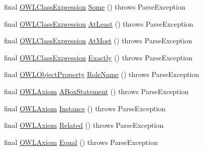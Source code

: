 \begin{DoxyCompactItemize}
\item 
final \hyperlink{interfaceorg_1_1semanticweb_1_1owlapi_1_1model_1_1_o_w_l_class_expression}{O\-W\-L\-Class\-Expression} \hyperlink{classorg_1_1coode_1_1owl_1_1krssparser_1_1_k_r_s_s_parser_ae93e7a9edf4acd496ed58d42231da0d2}{Some} ()  throws Parse\-Exception 
\item 
final \hyperlink{interfaceorg_1_1semanticweb_1_1owlapi_1_1model_1_1_o_w_l_class_expression}{O\-W\-L\-Class\-Expression} \hyperlink{classorg_1_1coode_1_1owl_1_1krssparser_1_1_k_r_s_s_parser_a313ce8384b82f5c65c92c6999b7996f7}{At\-Least} ()  throws Parse\-Exception 
\item 
final \hyperlink{interfaceorg_1_1semanticweb_1_1owlapi_1_1model_1_1_o_w_l_class_expression}{O\-W\-L\-Class\-Expression} \hyperlink{classorg_1_1coode_1_1owl_1_1krssparser_1_1_k_r_s_s_parser_aec0d9b6c7b4878492dfc66040a62d418}{At\-Most} ()  throws Parse\-Exception 
\item 
final \hyperlink{interfaceorg_1_1semanticweb_1_1owlapi_1_1model_1_1_o_w_l_class_expression}{O\-W\-L\-Class\-Expression} \hyperlink{classorg_1_1coode_1_1owl_1_1krssparser_1_1_k_r_s_s_parser_a96285a3a1ee2bee67e26d96b675c71bc}{Exactly} ()  throws Parse\-Exception 
\item 
final \hyperlink{interfaceorg_1_1semanticweb_1_1owlapi_1_1model_1_1_o_w_l_object_property}{O\-W\-L\-Object\-Property} \hyperlink{classorg_1_1coode_1_1owl_1_1krssparser_1_1_k_r_s_s_parser_a50020bbe7f9d004bb89129aea2324fa0}{Role\-Name} ()  throws Parse\-Exception 
\item 
final \hyperlink{interfaceorg_1_1semanticweb_1_1owlapi_1_1model_1_1_o_w_l_axiom}{O\-W\-L\-Axiom} \hyperlink{classorg_1_1coode_1_1owl_1_1krssparser_1_1_k_r_s_s_parser_a8f451b6730e3377cb7e5fae2ba347e22}{A\-Box\-Statement} ()  throws Parse\-Exception 
\item 
final \hyperlink{interfaceorg_1_1semanticweb_1_1owlapi_1_1model_1_1_o_w_l_axiom}{O\-W\-L\-Axiom} \hyperlink{classorg_1_1coode_1_1owl_1_1krssparser_1_1_k_r_s_s_parser_a9d77510d20749c23054d89ff5095458e}{Instance} ()  throws Parse\-Exception 
\item 
final \hyperlink{interfaceorg_1_1semanticweb_1_1owlapi_1_1model_1_1_o_w_l_axiom}{O\-W\-L\-Axiom} \hyperlink{classorg_1_1coode_1_1owl_1_1krssparser_1_1_k_r_s_s_parser_aaff41b596449bf0b7c50094d94be3f76}{Related} ()  throws Parse\-Exception 
\item 
final \hyperlink{interfaceorg_1_1semanticweb_1_1owlapi_1_1model_1_1_o_w_l_axiom}{O\-W\-L\-Axiom} \hyperlink{classorg_1_1coode_1_1owl_1_1krssparser_1_1_k_r_s_s_parser_a731829c95fb306247027281c3b258d9e}{Equal} ()  throws Parse\-Exception 

\end{DoxyCompactItemize}
